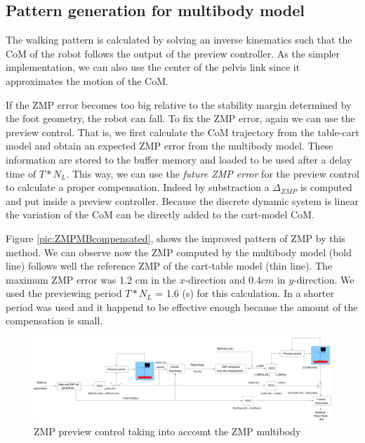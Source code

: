 \subsection{Pattern generation for multibody model}
The walking pattern is calculated by solving an inverse kinematics such that the CoM
of the robot follows the output of the preview controller. As the simpler implementation, we can 
also use the center of the pelvis link since it approximates the motion of the CoM.
\par
If the ZMP error becomes too big relative to the stability margin determined by the foot geometry,
the robot can fall. To fix the ZMP error, again we can use the preview control. That
is, we first calculate the CoM trajectory from the table-cart model and
obtain an expected ZMP error from the multibody model.
These information are stored to the buffer memory and loaded to be used after a delay time
of $T*N_L$. This way, we can use the \textit{future ZMP error} for the preview control 
to calculate a proper compensation.
Indeed by substraction a $\Delta_{ZMP}$ is computed and put inside a preview controller.
Because the discrete dynamic system is linear the variation of the CoM can be directly 
added to the cart-model CoM.
\par
Figure \ref{pic:ZMPMBcompensated}, shows the improved pattern of ZMP by this method. We can observe now the ZMP
computed by the multibody model (bold line) follows well the reference ZMP of the cart-table
model (thin line). The maximum ZMP error was 1.2 cm in the $x$-direction and $0.4 cm$ in $y$-direction.
We used the previewing period  $T*N_L$ = 1.6 (s) for this calculation. 
In \cite{Kajita2003} a shorter period was used and it happend to be effective enough 
because the amount of the compensation is small.
%
\clearpage
\begin{figure}[h]
\begin{center}
\includegraphics[angle=270,width=0.5\linewidth]{./figures/PatternGenerator/ZMPScheme2}
\caption{ZMP preview control taking into account the ZMP multibody }
\label{pic:ZMPScheme2}
\end{center}
\end{figure}
\clearpage
%
\clearpage
